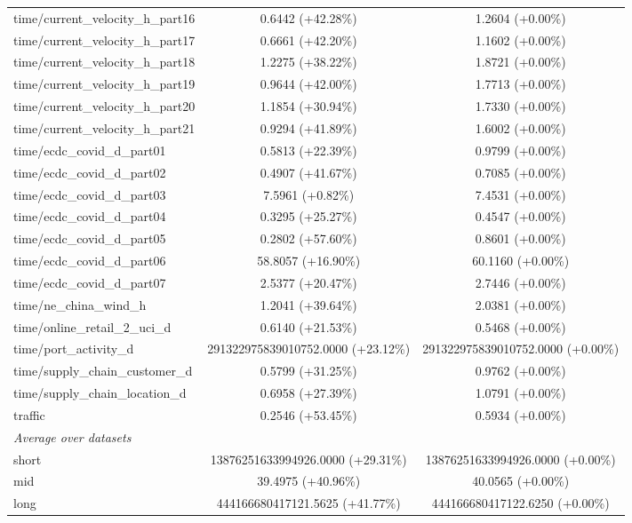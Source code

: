 \begin{table}[htbp]
{\begin{tabular}{lcc}
time/current\_velocity\_h\_part16 & 0.6442 (+42.28\%) & 1.2604 (+0.00\%) \\
time/current\_velocity\_h\_part17 & 0.6661 (+42.20\%) & 1.1602 (+0.00\%) \\
time/current\_velocity\_h\_part18 & 1.2275 (+38.22\%) & 1.8721 (+0.00\%) \\
time/current\_velocity\_h\_part19 & 0.9644 (+42.00\%) & 1.7713 (+0.00\%) \\
time/current\_velocity\_h\_part20 & 1.1854 (+30.94\%) & 1.7330 (+0.00\%) \\
time/current\_velocity\_h\_part21 & 0.9294 (+41.89\%) & 1.6002 (+0.00\%) \\
time/ecdc\_covid\_d\_part01 & 0.5813 (+22.39\%) & 0.9799 (+0.00\%) \\
time/ecdc\_covid\_d\_part02 & 0.4907 (+41.67\%) & 0.7085 (+0.00\%) \\
time/ecdc\_covid\_d\_part03 & 7.5961 (+0.82\%) & 7.4531 (+0.00\%) \\
time/ecdc\_covid\_d\_part04 & 0.3295 (+25.27\%) & 0.4547 (+0.00\%) \\
time/ecdc\_covid\_d\_part05 & 0.2802 (+57.60\%) & 0.8601 (+0.00\%) \\
time/ecdc\_covid\_d\_part06 & 58.8057 (+16.90\%) & 60.1160 (+0.00\%) \\
time/ecdc\_covid\_d\_part07 & 2.5377 (+20.47\%) & 2.7446 (+0.00\%) \\
time/ne\_china\_wind\_h & 1.2041 (+39.64\%) & 2.0381 (+0.00\%) \\
time/online\_retail\_2\_uci\_d & 0.6140 (+21.53\%) & 0.5468 (+0.00\%) \\
time/port\_activity\_d & 291322975839010752.0000 (+23.12\%) & 291322975839010752.0000 (+0.00\%) \\
time/supply\_chain\_customer\_d & 0.5799 (+31.25\%) & 0.9762 (+0.00\%) \\
time/supply\_chain\_location\_d & 0.6958 (+27.39\%) & 1.0791 (+0.00\%) \\
traffic & 0.2546 (+53.45\%) & 0.5934 (+0.00\%) \\
\midrule
\multicolumn{3}{l}{\textit{Average over datasets}} \\
short & 13876251633994926.0000 (+29.31\%) & 13876251633994926.0000 (+0.00\%) \\
mid & 39.4975 (+40.96\%) & 40.0565 (+0.00\%) \\
long & 444166680417121.5625 (+41.77\%) & 444166680417122.6250 (+0.00\%) \\
\bottomrule
\end{tabular}%
}
\label{tab:tsfm-nmse-marginals}
\end{table}